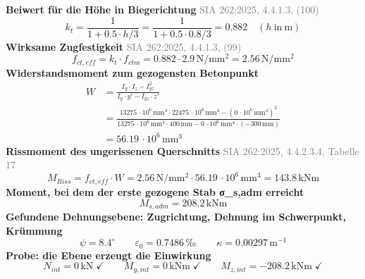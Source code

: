 \documentclass[11pt,a4paper]{article}
\newcommand{\normref}[1]{{\small\textcolor{gray}{#1}}}
\begin{document}
\noindent\textbf{Beiwert für die Höhe in Biegerichtung} \hfill \normref{SIA 262:2025, 4.4.1.3, (100)}
\begin{equation*}
k_t = \frac{1}{1 + 0.5 \cdot h/3} = \frac{1}{1 + 0.5 \cdot 0.8/3} = 0.882 \quad \left(h\ \text{in}\ \mathrm{m}\right)
\end{equation*}
\noindent\textbf{Wirksame Zugfestigkeit} \hfill \normref{SIA 262:2025, 4.4.1.3, (99)}
\begin{equation*}
f_{ct,eff} = k_t \cdot f_{ctm} = 0.882 \cdot 2.9\,\mathrm{N}/\mathrm{mm}^{2} = 2.56\,\mathrm{N}/\mathrm{mm}^{2}
\end{equation*}
\noindent\textbf{Widerstandsmoment zum gezogensten Betonpunkt}
\begin{equation*}
\begin{aligned}
  W &= \frac{I_y \cdot I_z - I_{yz}^{2}}{I_y \cdot y' - I_{yz} \cdot z'} \\
  &= \frac{13275\,\cdot 10^{6}\,\mathrm{mm}^{4} \cdot 22475\,\cdot 10^{6}\,\mathrm{mm}^{4} - \left(0\,\cdot 10^{6}\,\mathrm{mm}^{4}\right)^{2}}{13275\,\cdot 10^{6}\,\mathrm{mm}^{4} \cdot 400\,\mathrm{mm} - 0\,\cdot 10^{6}\,\mathrm{mm}^{4} \cdot \left(-300\,\mathrm{mm}\right)} \\
  &= 56.19\,\cdot 10^{6}\,\mathrm{mm}^{3}
\end{aligned}
\end{equation*}
\noindent\textbf{Rissmoment des ungerissenen Querschnitts} \hfill \normref{SIA 262:2025, 4.4.2.3.4, Tabelle 17}
\begin{equation*}
M_{Riss} = f_{ct,eff} \cdot W = 2.56\,\mathrm{N}/\mathrm{mm}^{2} \cdot 56.19\,\cdot 10^{6}\,\mathrm{mm}^{3} = 143.8\,\mathrm{kNm}
\end{equation*}
\noindent\textbf{Moment, bei dem der erste gezogene Stab σ\_s,adm erreicht}
\begin{equation*}
M_{s,adm} = 208.2\,\mathrm{kNm}
\end{equation*}
\noindent\textbf{Gefundene Dehnungsebene: Zugrichtung, Dehnung im Schwerpunkt, Krümmung}
\begin{equation*}
\psi = 8.4^\circ \qquad \varepsilon_0 = 0.7486\,\text{‰} \qquad \kappa = 0.00297\,\mathrm{m}^{-1}
\end{equation*}
\noindent\textbf{Probe: die Ebene erzeugt die Einwirkung}
\begin{equation*}
N_{int} = 0\,\mathrm{kN} \;\checkmark \qquad M_{y,int} = 0\,\mathrm{kNm} \;\checkmark \qquad M_{z,int} = -208.2\,\mathrm{kNm} \;\checkmark
\end{equation*}
\end{document}
